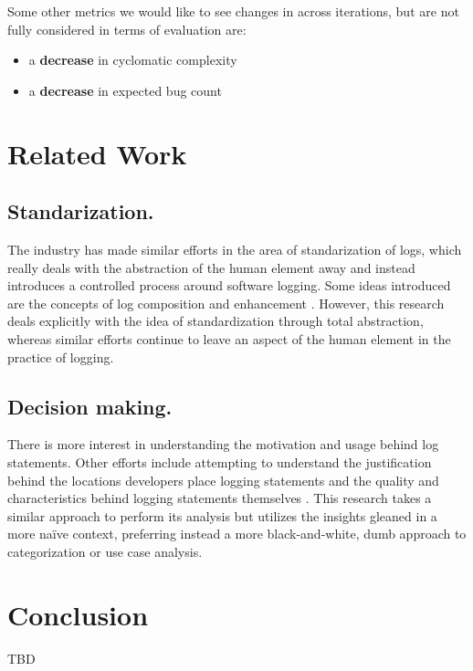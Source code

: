 \documentclass[acmsmall,review,authorversion]{acmart}
\begin{document}
Some other metrics we would like to see changes in across iterations, but are not fully considered in terms of evaluation are:

\begin{itemize}
    \item a \textbf{decrease} in cyclomatic complexity
    \item a \textbf{decrease} in expected bug count
\end{itemize}


\section{Related Work}

    \subsection{Standarization.} The industry has made similar efforts in the area of standarization of logs, which really deals with the abstraction of the human element away and instead introduces a controlled process around software logging. Some ideas introduced are the concepts of log composition \cite{DBLP:conf/dls/Marron18} and enhancement \cite{DBLP:journals/tocs/YuanZPZS12}. However, this research deals explicitly with the idea of standardization through total abstraction, whereas similar efforts continue to leave an aspect of the human element in the practice of logging.

    \subsection{Decision making.} There is more interest in understanding the motivation and usage behind log statements. Other efforts include attempting to understand the justification behind the locations developers place logging statements \cite{DBLP:conf/icse/FuZHLDLZX14} and the quality and characteristics behind logging statements themselves \cite{DBLP:conf/icse/YuanPZ12}. This research takes a similar approach to perform its analysis but utilizes the insights gleaned in a more naïve context, preferring instead a more black-and-white, dumb approach to categorization or use case analysis.

\section{Conclusion}


\begin{acks}
    TBD
\end{acks}




\end{document}
